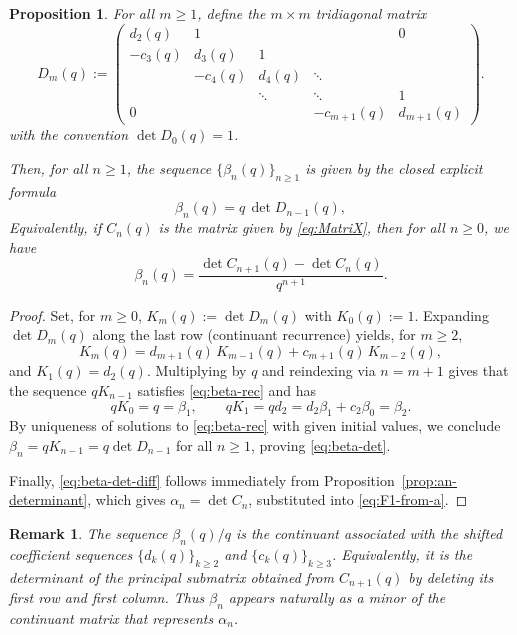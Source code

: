 \documentclass[letterpaper,12pt]{article}
\newtheorem{proposition}{Proposition}
\newtheorem{remark}{Remark}
\begin{document}
\begin{proposition}\label{prop:beta-determinant}
For all $m\geq 1$, define the $m\times m$ tridiagonal matrix
\begin{equation}
    D_m(q):=
\begin{pmatrix}
d_2(q) & 1      &        &        & 0\\
-c_3(q)& d_3(q) & 1      &        &  \\
       & -c_4(q)& d_4(q) & \ddots &  \\
       &        & \ddots & \ddots & 1\\
0      &        &        & -c_{m+1}(q)& d_{m+1}(q)
\end{pmatrix}.
\end{equation}
with the convention $\det D_0(q)=1$.

Then, for all $n\geq1$,  the  sequence $\{\beta_n(q)\}_{n\ge 1}$ 
is given by the closed explicit formula
\begin{equation}\label{eq:beta-det}
\beta_n(q)=q\,\det D_{n-1}(q),
\end{equation}
Equivalently, if $C_n(q)$ is the matrix given by \eqref{eq:MatriX}, then for all $n\geq 0$, we have 
\begin{equation}\label{eq:beta-det-diff}
\beta_n(q)=\frac{\det C_{n+1}(q)-\det C_n(q)}{q^{n+1}}.
\end{equation}
\end{proposition}

\begin{proof}
Set, for $m\ge0$, $K_m(q):=\det D_m(q)$ with $K_0(q):=1$. Expanding $\det D_m(q)$ along the last row (continuant recurrence) yields, for $m\ge2$,
\[
K_m(q)=d_{m+1}(q)\,K_{m-1}(q)+c_{m+1}(q)\,K_{m-2}(q),
\]
and $K_1(q)=d_2(q)$. Multiplying by $q$ and reindexing via $n=m+1$ gives that
the sequence $qK_{n-1}$ satisfies \eqref{eq:beta-rec} and has
\[
qK_0=q=\beta_1,\qquad qK_1=qd_2=d_2\beta_1+c_2\beta_0=\beta_2.
\]
By uniqueness of solutions to \eqref{eq:beta-rec} with given initial values, we conclude
$\beta_n=qK_{n-1}=q\det D_{n-1}$ for all $n\ge1$, proving \eqref{eq:beta-det}.

Finally, \eqref{eq:beta-det-diff} follows immediately from Proposition~\ref{prop:an-determinant},
which gives $\alpha_n=\det C_n$, substituted into \eqref{eq:F1-from-a}.
\end{proof}

\begin{remark}
The sequence $\beta_n(q)/q$ is the continuant associated with the
shifted coefficient sequences $\{d_k(q)\}_{k\ge2}$ and $\{c_k(q)\}_{k\ge3}$.
Equivalently, it is the determinant of the principal submatrix obtained
from $C_{n+1}(q)$ by deleting its first row and first column.
Thus $\beta_n$ appears naturally as a minor of the continuant matrix
that represents $\alpha_n$.
\end{remark}
\end{document}
